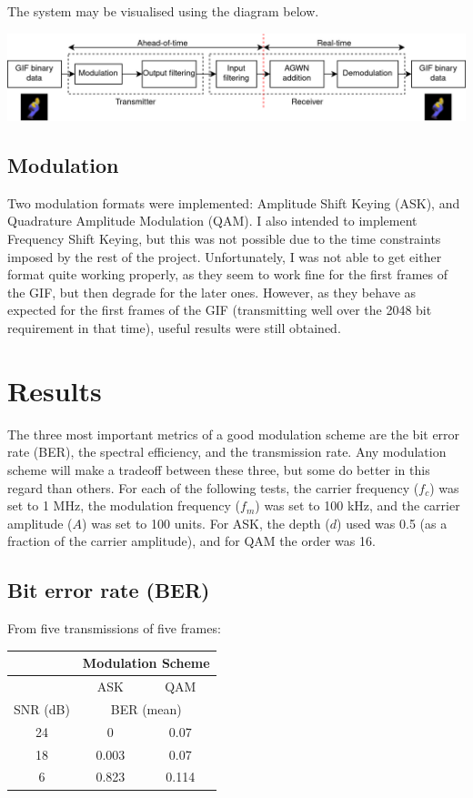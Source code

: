 \documentclass{article}
\begin{document}
The system may be visualised using the diagram below. 

\noindent
\includegraphics[width=\textwidth]{figures/system-diagram.png}

\subsection{Modulation}
Two modulation formats were implemented: Amplitude Shift Keying (ASK), and Quadrature Amplitude Modulation (QAM). I also intended to implement Frequency Shift Keying, but this was not possible due to the time constraints imposed by the rest of the project. Unfortunately, I was not able to get either format quite working properly, as they seem to work fine for the first frames of the GIF, but then degrade for the later ones. However, as they behave as expected for the first frames of the GIF (transmitting well over the 2048 bit requirement in that time), useful results were still obtained.

\section{Results}
The three most important metrics of a good modulation scheme are the bit error rate (BER), the spectral efficiency, and the transmission rate. Any modulation scheme will make a tradeoff between these three, but some do better in this regard than others. For each of the following tests, the carrier frequency ($f_c$) was set to 1 MHz, the modulation frequency ($f_m$) was set to 100 kHz, and the carrier amplitude ($A$) was set to 100 units. For ASK, the depth ($d$) used was 0.5 (as a fraction of the carrier amplitude), and for QAM the order was 16.   

\subsection{Bit error rate (BER)}
From five transmissions of five frames:
\begin{center}
    \begin{tabular}{|c|c|c|}
        \hline
                 & \multicolumn{2}{c|}{Modulation Scheme}         \\ \hline
                 & ASK                                    & QAM   \\ \hline
        SNR (dB) & \multicolumn{2}{c|}{BER (mean)}                \\ \hline
        24       & 0                                      & 0.07  \\
        18       & 0.003                                  & 0.07  \\
        6        & 0.823                                  & 0.114 \\ \hline
    \end{tabular}
\end{center}
\end{document}
